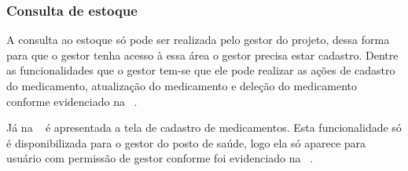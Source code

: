\subsubsection{Consulta de estoque}

A consulta ao estoque só pode ser realizada pelo gestor do projeto, dessa forma para que o gestor tenha acesso à essa área o gestor precisa estar cadastro. Dentre as funcionalidades que o gestor  tem-se que ele pode realizar as ações de cadastro do medicamento, atualização do medicamento e deleção do medicamento conforme evidenciado na ~. 

%

%

Já na ~ é apresentada a tela de cadastro de medicamentos. Esta funcionalidade só é disponibilizada para o gestor do posto de saúde, logo ela só aparece para usuário com permissão de gestor conforme foi evidenciado na ~.
